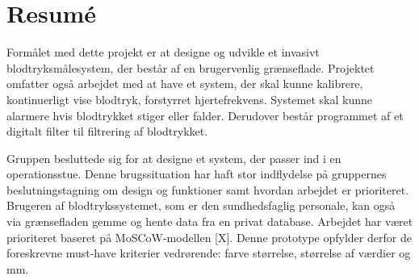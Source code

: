 \chapter*{Resumé}

Formålet med dette projekt er at designe og udvikle et invasivt blodtryksmålesystem, der består af en brugervenlig grænseflade. Projektet omfatter også arbejdet med at have et system, der skal kunne kalibrere, kontinuerligt vise blodtryk, forstyrret hjertefrekvens. Systemet skal kunne alarmere hvis blodtrykket stiger eller falder. Derudover består programmet af et digitalt filter til filtrering af blodtrykket.

Gruppen besluttede sig for at designe et system, der passer ind i en operationsstue. Denne brugssituation har haft stor indflydelse på gruppernes beslutningstagning om design og funktioner samt hvordan arbejdet er prioriteret. Brugeren af blodtrykssystemet, som er den sundhedsfaglig personale, kan også via grænsefladen gemme og hente data fra en privat database.
Arbejdet har været prioriteret baseret på MoSCoW-modellen [X]. Denne prototype opfylder derfor de foreskrevne must-have kriterier vedrørende: farve størrelse, størrelse af værdier og mm.


\clearpage